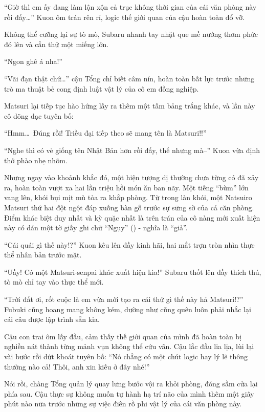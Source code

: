 \documentclass[../main.tex]{subfiles}
\begin{document}

``Giờ thì em ấy đang làm lộn xộn cả trục không thời gian của cái văn phòng này rồi đấy\dots'' Kuon ôm trán rên rỉ, logic thế giới quan của cậu hoàn toàn đổ vỡ.

Không thể cưỡng lại sự tò mò, Subaru nhanh tay nhặt que mề nướng thơm phức đó lên và cắn thử một miếng lớn.

``Ngon ghê á nha!''

``Vãi đạn thật chứ\dots'' cậu Tổng chỉ biết câm nín, hoàn toàn bất lực trước những trò ma thuật bẻ cong định luật vật lý của cô em đồng nghiệp.

Matsuri lại tiếp tục hào hứng lấy ra thêm một tấm bảng trắng khác, và lần này cô dõng dạc tuyên bố:

``Hmm\dots\ Đúng rồi! Triều đại tiếp theo sẽ mang tên là Matsuri!!''

``Nghe thì có vẻ giống tên Nhật Bản hơn rồi đấy, thế nhưng mà--'' Kuon vừa định thở phào nhẹ nhõm.


Nhưng ngay vào khoảnh khắc đó, một hiện tượng dị thường chưa từng có đã xảy ra, hoàn toàn vượt xa hai lần triệu hồi món ăn ban nãy. Một tiếng ``bùm'' lớn vang lên, khói bụi mịt mù tỏa ra khắp phòng. Từ trong làn khói, một Natsuiro Matsuri thứ hai đột ngột đáp xuống bàn gỗ trước sự sững sờ của cả căn phòng. Điểm khác biệt duy nhất và kỳ quặc nhất là trên trán của cô nàng mới xuất hiện này có dán một tờ giấy ghi chữ ``Ngụy'' () - nghĩa là ``giả''.

``Cái quái gì thế này!?'' Kuon kêu lên đầy kinh hãi, hai mắt trợn tròn nhìn thực thể nhân bản trước mặt.

``Uầy! Có một Matsuri-senpai khác xuất hiện kìa!'' Subaru thốt lên đầy thích thú, tò mò chỉ tay vào thực thể mới.

``Trời đất ơi, rốt cuộc là em vừa mới tạo ra cái thứ gì thế này hả Matsuri!?'' Fubuki cũng hoang mang không kém, dường như cũng quên luôn phải nhắc lại cái câu được lập  trình sẵn kia.

Cậu con trai ôm lấy đầu, cảm thấy thế giới quan của mình đã hoàn toàn bị nghiền nát thành từng mảnh vụn không thể cứu vãn. Cậu lắc đầu lia lịa, lùi lại vài bước rồi dứt khoát tuyên bố: ``Nó chẳng có một chút logic hay lý lẽ thông thường nào cả! Thôi, anh xin kiếu ở đây nhé!''

Nói rồi, chàng Tổng quản lý quay lưng bước vội ra khỏi phòng, đóng sầm cửa lại phía sau. Cậu thực sự không muốn tự hành hạ trí não của mình thêm một giây phút nào nữa trước những sự việc điên rồ phi vật lý của cái văn phòng này.
\end{document}
